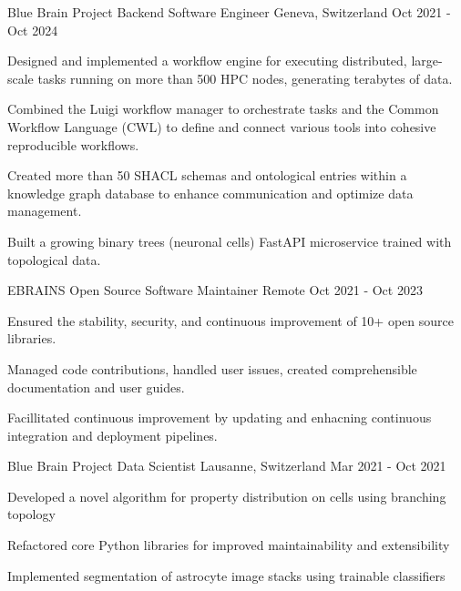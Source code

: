 \begin{cventries}
\cventry
{Blue Brain Project} %
{Backend Software Engineer} %
{Geneva, Switzerland} %
{Oct 2021 - Oct 2024} %
{ %
\begin{cvitems}
\item{Designed and implemented a workflow engine for executing distributed, large-scale tasks running on more than 500 HPC nodes, generating terabytes of data.}
\item{Combined the Luigi workflow manager to orchestrate tasks and the Common Workflow Language (CWL) to define and connect various tools into cohesive reproducible workflows.}
\item{Created more than 50 SHACL schemas and ontological entries within a knowledge graph database to enhance communication and optimize data management.}
\item{Built a growing binary trees (neuronal cells) FastAPI microservice trained with topological data.}
\end{cvitems}
}

\cventry
{EBRAINS}
{Open Source Software Maintainer} %
{Remote} %
{Oct 2021 - Oct 2023} %
{ %
\begin{cvitems}
\item{Ensured the stability, security, and continuous improvement of 10+ open source libraries.}
\item{Managed code contributions, handled user issues, created comprehensible documentation and user guides.}
\item{Facillitated continuous improvement by updating and enhacning continuous integration and deployment pipelines.}
\end{cvitems}
}



\cventry
{Blue Brain Project}
{Data Scientist} %
{Lausanne, Switzerland} %
{Mar 2021 - Oct 2021} %
{ %
\begin{cvitems}
\item{Developed a novel algorithm for property distribution on cells using branching topology}
\item{Refactored core Python libraries for improved maintainability and extensibility}
\item{Implemented segmentation of astrocyte image stacks using trainable classifiers}
\end{cvitems}
}


\end{cventries}
